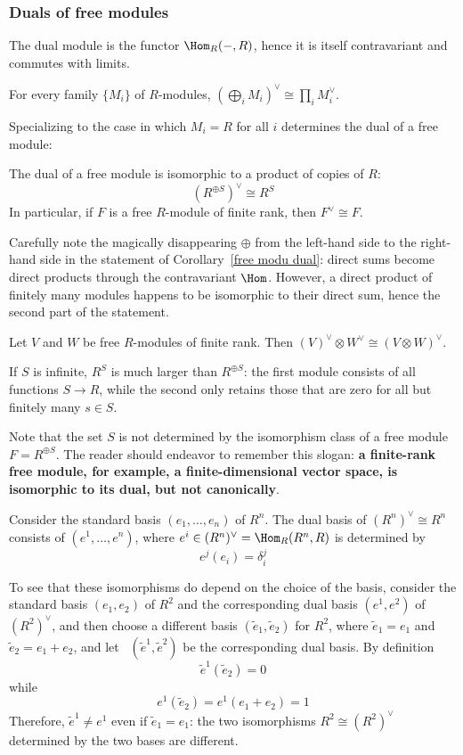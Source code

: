 \subsubsection{Duals of free modules}
The dual module is the functor $\Hom_R(-,R)$, hence it is itself contravariant and commutes with limits.
\begin{corollary}\label{dual sum}
For every family $\{M_i\}$ of $R$-modules, $(\bigoplus_{i}M_i)^{\vee}\cong\prod_iM_i^{\vee}$.
\end{corollary}
Specializing to the case in which $M_i=R$ for all $i$ determines the dual of a free module:
\begin{corollary}\label{free modu dual}
The dual of a free module is isomorphic to a product of copies of $R$:
\[(R^{\oplus S})^{\vee}\cong R^S\]
In particular, if $F$ is a free $R$-module of finite rank, then $F^{\vee}\cong F$.
\end{corollary}
Carefully note the magically disappearing $\oplus$ from the left-hand side to the right-hand side in the statement of Corollary~\ref{free modu dual}: direct sums become direct products through the contravariant $\Hom$. However, a direct product of finitely many modules happens to be isomorphic to their direct sum, hence the second part of the statement.
\begin{corollary}
Let $V$ and $W$ be free $R$-modules of finite rank. Then $(V)^\vee\otimes W^\vee\cong(V\otimes W)^\vee$.
\end{corollary}
\begin{remark}
If $S$ is infinite, $R^S$ is much larger than $R^{\oplus S}$: the first module consists of all functions $S\to R$, while the second only retains those that are zero for all but finitely many $s\in S$.
\end{remark}
\begin{remark}
Note that the set $S$ is not determined by the isomorphism class of a free module $F=R^{\oplus S}$. The reader should endeavor to remember this slogan: \textbf{a finite-rank free module, for example, a finite-dimensional vector space, is isomorphic to its dual, but not canonically}.
\end{remark}
\begin{definition}
Consider the standard basis $(e_1,\dots,e_n)$ of $R^n$. The dual basis of $(R^n)^{\vee}\cong R^n$ consists of $(e^1,\dots,e^n)$, where $e^i\in (R^n)^{\vee}=\Hom_R(R^n,R)$ is determined by
\[e^j(e_i)=\delta^j_i\]
\end{definition}
\begin{example}
To see that these isomorphisms do depend on the choice of the basis, consider the standard basis $(e_1,e_2)$ of $R^2$ and the corresponding dual basis $(e^1,e^2)$ of 
$(R^2)^{\vee}$, and then choose a different basis $(\widetilde{e}_1,\widetilde{e}_2)$ for $R^2$, where $\widetilde{e}_1=e_1$ and $\widetilde{e}_2=e_1+e_2$, and let \
$(\widetilde{e}^1,\widetilde{e}^2)$ be the corresponding dual basis. By definition
\[\widetilde{e}^1(\widetilde{e}_2)=0\]
while
\[e^1(\widetilde{e}_2)=e^1(e_1+e_2)=1\]
Therefore, $\widetilde{e}^1\neq e^1$ even if $\widetilde{e}_1=e_1$: the two isomorphisms $R^2\cong(R^2)^{\vee}$ determined by the two bases are different.
\end{example}
